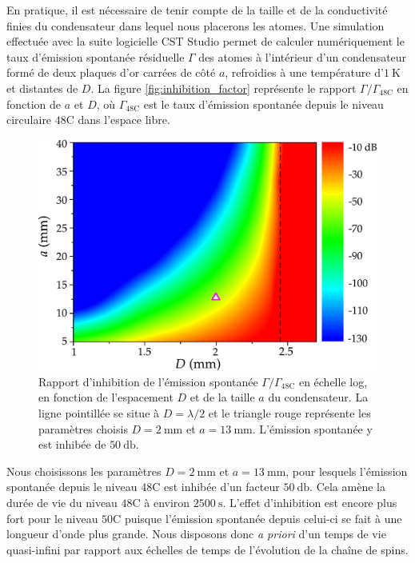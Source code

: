 En pratique, il est nécessaire de tenir compte de la taille et de la conductivité finies du condensateur dans lequel nous placerons les atomes.
Une simulation effectuée avec la suite logicielle CST Studio permet de calculer numériquement le taux d'émission spontanée résiduelle $\Gamma$ des atomes à l'intérieur d'un condensateur formé de deux plaques d'or carrées de côté $a$, refroidies à une température d'$\SI{1}{\K}$ et distantes de $D$.
La figure \eqref{fig:inhibition_factor} représente le rapport $\Gamma/\Gamma_{\mathrm{48C}}$ en fonction de $a$ et $D$, où $\Gamma_{\mathrm{48C}}$ est le taux d'émission spontanée depuis le niveau circulaire $\mathrm{48C}$ dans l'espace libre.
%
\begin{figure}[h]
\centering
\includegraphics[width=.7\linewidth]{figures/circsim/inhibition_factor}
\caption[Inhibition de l'émission spontanée en fonction des dimensions du condensateur]{
Rapport d'inhibition de l'émission spontanée $\Gamma/\Gamma_{\mathrm{48C}}$ en échelle log, en fonction de l'espacement $D$ et de la taille $a$ du condensateur.
La ligne pointillée se situe à $D=\lambda/2$ et le triangle rouge représente les paramètres choisis $D=\SI{2}{\mm}$ et $a=\SI{13}{\mm}$.
L'émission spontanée y est inhibée de $\SI{50}{\decibel}$.
}
\label{fig:inhibition_factor}
\end{figure}
%
Nous choisissons les paramètres $D=\SI{2}{\mm}$ et $a=\SI{13}{\mm}$, pour lesquels l'émission spontanée depuis le niveau $\mathrm{48C}$ est inhibée d'un facteur $\SI{50}{\decibel}$.
Cela amène la durée de vie du niveau $\mathrm{48C}$ à environ $\SI{2500}{\second}$.
L'effet d'inhibition est encore plus fort pour le niveau $\mathrm{50C}$ puisque l'émission spontanée depuis celui-ci se fait à une longueur d'onde plus grande.
Nous disposons donc \textit{a priori} d'un temps de vie quasi-infini par rapport aux échelles de temps de l'évolution de la chaîne de spins.

